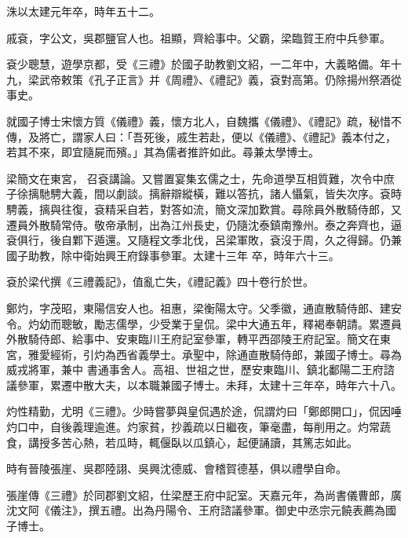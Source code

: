 \begin{pinyinscope}
 洙以太建元年卒，時年五十二。



 戚袞，字公文，吳郡鹽官人也。祖顯，齊給事中。父霸，梁臨賀王府中兵參軍。



 袞少聰慧，遊學京都，受《三禮》於國子助教劉文紹，一二年中，大義略備。年十九，梁武帝敕策《孔子正言》并《周禮》、《禮記》義，袞對高第。仍除揚州祭酒從事史。



 就國子博士宋懷方質《儀禮》義，懷方北人，自魏攜《儀禮》、《禮記》疏，秘惜不傳，及將亡，謂家人曰：「吾死後，戚生若赴，便以《儀禮》、《禮記》義本付之，若其不來，即宜隨屍而殯。」其為儒者推許如此。尋兼太學博士。



 梁簡文在東宮，
 召袞講論。又嘗置宴集玄儒之士，先命道學互相質難，次令中庶子徐摛馳騁大義，間以劇談。摛辭辯縱橫，難以答抗，諸人懾氣，皆失次序。袞時騁義，摛與往復，袞精采自若，對答如流，簡文深加歎賞。尋除員外散騎侍郎，又遷員外散騎常侍。敬帝承制，出為江州長史，仍隨沈泰鎮南豫州。泰之奔齊也，逼袞俱行，後自鄴下遁還。又隨程文季北伐，呂梁軍敗，袞沒于周，久之得歸。仍兼國子助教，除中衛始興王府錄事參軍。太建十三年
 卒，時年六十三。



 袞於梁代撰《三禮義記》，值亂亡失，《禮記義》四十卷行於世。



 鄭灼，字茂昭，東陽信安人也。祖惠，梁衡陽太守。父季徽，通直散騎侍郎、建安令。灼幼而聰敏，勵志儒學，少受業于皇侃。梁中大通五年，釋褐奉朝請。累遷員外散騎侍郎、給事中、安東臨川王府記室參軍，轉平西邵陵王府記室。簡文在東宮，雅愛經術，引灼為西省義學士。承聖中，除通直散騎侍郎，兼國子博士。尋為威戎將軍，兼中
 書通事舍人。高祖、世祖之世，歷安東臨川、鎮北鄱陽二王府諮議參軍，累遷中散大夫，以本職兼國子博士。未拜，太建十三年卒，時年六十八。



 灼性精勤，尤明《三禮》。少時嘗夢與皇侃遇於途，侃謂灼曰「鄭郎開口」，侃因唾灼口中，自後義理逾進。灼家貧，抄義疏以日繼夜，筆毫盡，每削用之。灼常蔬食，講授多苦心熱，若瓜時，輒偃臥以瓜鎮心，起便誦讀，其篤志如此。



 時有晉陵張崖、吳郡陸詡、吳興沈德威、會稽賀德基，俱以禮學自命。



 張崖傳《三禮》於同郡劉文紹，仕梁歷王府中記室。天嘉元年，為尚書儀曹郎，廣沈文阿《儀注》，撰五禮。出為丹陽令、王府諮議參軍。御史中丞宗元饒表薦為國子博士。




\end{pinyinscope}
